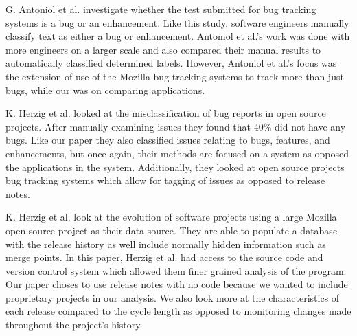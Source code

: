 \documentclass{acm_proc_article-sp}
\begin{document}
G. Antoniol  et al. \cite{Antoiol} investigate whether the test submitted for bug tracking systems is a bug or an enhancement. 
Like this study, software engineers manually classify text as either a bug or enhancement.
Antoniol et al.'s work was done with more engineers on a larger scale and also compared their manual results to automatically classified determined labels.
However, Antoniol et al.'s focus was the extension of use of the Mozilla bug tracking systems to track more than just bugs, while our was on comparing applications.


 K. Herzig et al. \cite{HerzigMis} looked at the misclassification of bug reports in open source projects. After manually examining issues they found that 40\% did not have any bugs. 
 Like our paper they also classified issues relating to bugs, features, and enhancements, but once again, their methods are focused on a system as opposed the applications in the system.
 Additionally, they looked at open source projects bug tracking systems which allow for tagging of issues as opposed to release notes.
 

 K. Herzig et al. \cite{HerzigData} look at the evolution of software projects using a large Mozilla open source project as their data source. They are able to populate a database with the release history as well include normally hidden information such as merge points.
 In this paper, Herzig et al. had access to the source code and version control system which allowed them finer grained analysis of the program. Our paper choses to use release notes with no code because we wanted to include proprietary projects in our analysis. We also look more at the characteristics of each release compared to the cycle length as opposed to monitoring changes made throughout the project's history.
 




\end{document}
